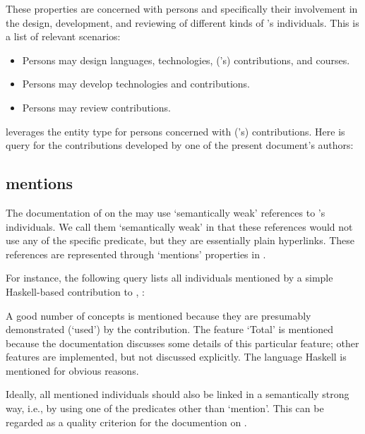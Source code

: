 These properties are concerned with persons and specifically
their involvement in the design, development, and reviewing of
different kinds of \solasote{}'s individuals. This is a list of
relevant scenarios:
%
\begin{itemize}
\item Persons may design languages, technologies, (\ooo{}'s) contributions, and
  courses.
\item Persons may develop technologies and contributions.
\item Persons may review contributions.
\end{itemize}
%
\solasote{} leverages the entity type  for
persons concerned with (\ooo{}'s) contributions. Here is query for the
contributions developed by one of the present document's authors:




\subsection{mentions}
\label{S:mentions}

The documentation of \solasote{} on the  may use
`semantically weak' references to \solasote's individuals. We call
them `semantically weak' in that these references would not use any of
the specific predicate, but they are essentially plain
hyperlinks. These references are represented through `mentions'
properties in \solasote. 

For instance, the following query lists all individuals mentioned by a
simple Haskell-based contribution to \ooo{},
:



\noindent
A good number of concepts is mentioned because they are presumably
demonstrated (`used') by the contribution. The feature `Total' is
mentioned because the documentation discusses some details of this
particular feature; other features are implemented, but not discussed
explicitly. The language Haskell is mentioned for obvious reasons.

Ideally, all mentioned individuals should also be linked in a
semantically strong way, i.e., by using one of the predicates other
than `mention'. This can be regarded as a quality criterion for the
documention on .

